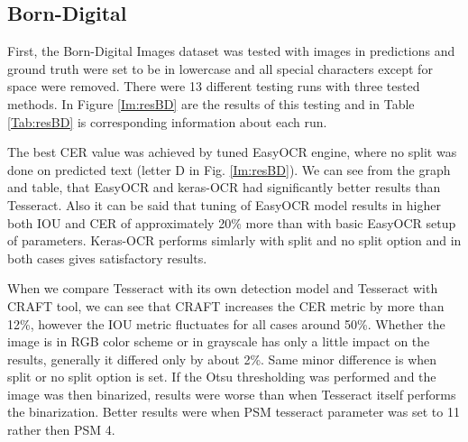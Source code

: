 \subsection*{Born-Digital}

First, the Born-Digital Images dataset was tested with images in predictions and ground truth were set to be in lowercase and all special characters except for space were removed. There were 13 different testing runs with three tested methods.  In Figure \ref*{Im:resBD} are the results of this testing and in Table \ref*{Tab:resBD} is corresponding information about each run. 

The best CER value was achieved by tuned EasyOCR engine, where no split was done on predicted text (letter D in Fig. \ref*{Im:resBD}). We can see from the graph and table, that EasyOCR and keras-OCR had significantly better results than Tesseract. Also it can be said that tuning of EasyOCR model results in higher both IOU and CER of approximately 20\% more than with basic EasyOCR setup of parameters. Keras-OCR performs simlarly with split and no split option and in both cases gives satisfactory results.

When we compare Tesseract with its own detection model and Tesseract with CRAFT tool, we can see that CRAFT increases the CER metric by more than 12\%, however the IOU metric fluctuates for all cases around 50\%. Whether the image is in RGB color scheme or in grayscale has only a little impact on the results, generally it differed only by about 2\%. Same minor difference is when split or no split option is set. If the Otsu thresholding was performed and the image was then binarized, results were worse than when Tesseract itself performs the binarization. Better results were when PSM tesseract parameter was set to 11 rather then PSM 4.

